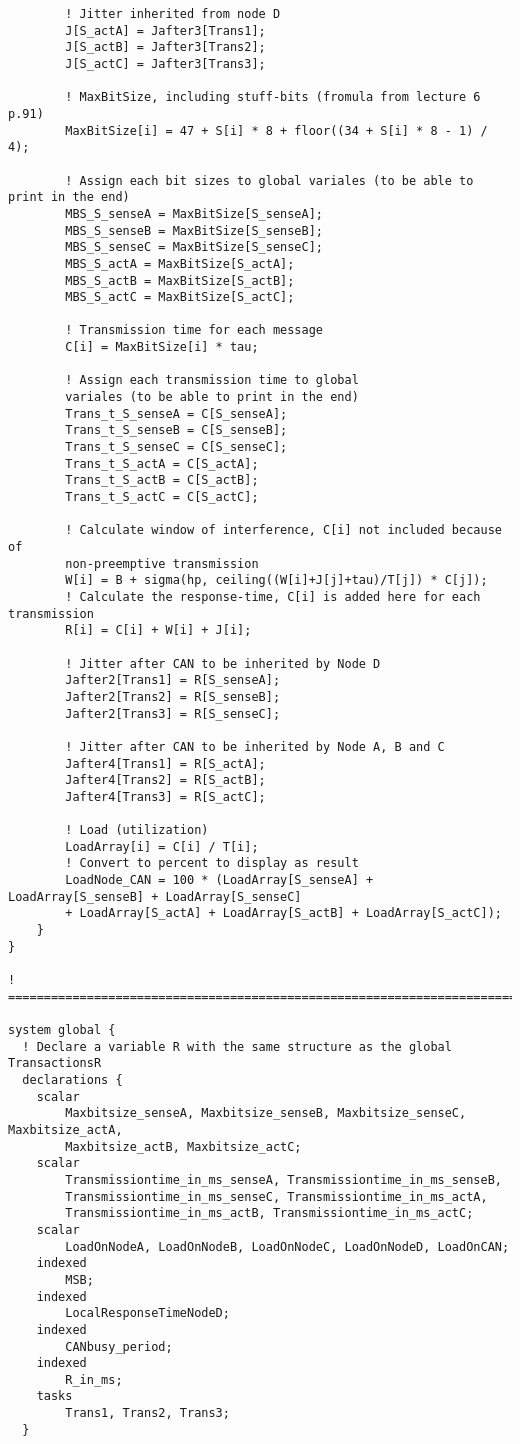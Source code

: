 \begin{lstlisting}
		! Jitter inherited from node D
		J[S_actA] = Jafter3[Trans1];
		J[S_actB] = Jafter3[Trans2];
		J[S_actC] = Jafter3[Trans3];

		! MaxBitSize, including stuff-bits (fromula from lecture 6 p.91)
		MaxBitSize[i] = 47 + S[i] * 8 + floor((34 + S[i] * 8 - 1) / 4);

		! Assign each bit sizes to global variales (to be able to print in the end)
		MBS_S_senseA = MaxBitSize[S_senseA];
		MBS_S_senseB = MaxBitSize[S_senseB];
		MBS_S_senseC = MaxBitSize[S_senseC];
		MBS_S_actA = MaxBitSize[S_actA];
		MBS_S_actB = MaxBitSize[S_actB];
		MBS_S_actC = MaxBitSize[S_actC];

		! Transmission time for each message
		C[i] = MaxBitSize[i] * tau;

		! Assign each transmission time to global 
        variales (to be able to print in the end)
		Trans_t_S_senseA = C[S_senseA];
		Trans_t_S_senseB = C[S_senseB];
		Trans_t_S_senseC = C[S_senseC];
		Trans_t_S_actA = C[S_actA];
		Trans_t_S_actB = C[S_actB];
		Trans_t_S_actC = C[S_actC];

		! Calculate window of interference, C[i] not included because of 
        non-preemptive transmission
		W[i] = B + sigma(hp, ceiling((W[i]+J[j]+tau)/T[j]) * C[j]);
		! Calculate the response-time, C[i] is added here for each transmission
		R[i] = C[i] + W[i] + J[i];

		! Jitter after CAN to be inherited by Node D
		Jafter2[Trans1] = R[S_senseA];
		Jafter2[Trans2] = R[S_senseB];
		Jafter2[Trans3] = R[S_senseC];

		! Jitter after CAN to be inherited by Node A, B and C
		Jafter4[Trans1] = R[S_actA];
		Jafter4[Trans2] = R[S_actB];
		Jafter4[Trans3] = R[S_actC];

		! Load (utilization)
		LoadArray[i] = C[i] / T[i];
		! Convert to percent to display as result
		LoadNode_CAN = 100 * (LoadArray[S_senseA] + LoadArray[S_senseB] + LoadArray[S_senseC] 
        + LoadArray[S_actA] + LoadArray[S_actB] + LoadArray[S_actC]);
	}
}

! =======================================================================

system global {
  ! Declare a variable R with the same structure as the global TransactionsR
  declarations {
	scalar
		Maxbitsize_senseA, Maxbitsize_senseB, Maxbitsize_senseC, Maxbitsize_actA, 
        Maxbitsize_actB, Maxbitsize_actC; 
	scalar	
		Transmissiontime_in_ms_senseA, Transmissiontime_in_ms_senseB, 
        Transmissiontime_in_ms_senseC, Transmissiontime_in_ms_actA, 
        Transmissiontime_in_ms_actB, Transmissiontime_in_ms_actC;
	scalar
		LoadOnNodeA, LoadOnNodeB, LoadOnNodeC, LoadOnNodeD, LoadOnCAN;  
	indexed
		MSB;
	indexed
		LocalResponseTimeNodeD;
	indexed	
		CANbusy_period;
    indexed 
		R_in_ms;
    tasks
		Trans1, Trans2, Trans3;
  }
  

\end{lstlisting}
